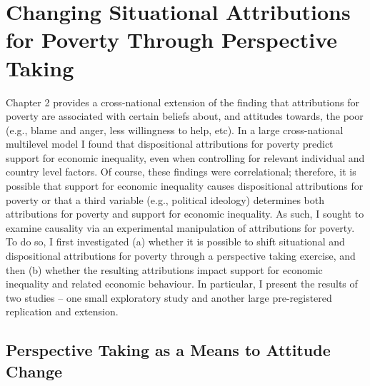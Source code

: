 \documentclass{sfuthesis}
\begin{document}
\chapter{Changing Situational Attributions for Poverty Through Perspective Taking}

Chapter 2 provides a cross-national extension of the finding that attributions for poverty are associated with certain beliefs about, and attitudes towards, the poor (e.g., blame and anger, less willingness to help, etc). In a large cross-national multilevel model I found that dispositional attributions for poverty predict support for economic inequality, even when controlling for relevant individual and country level factors. Of course, these findings were correlational; therefore, it is possible that support for economic inequality causes dispositional attributions for poverty or that a third variable (e.g., political ideology) determines both attributions for poverty and support for economic inequality. As such, I sought to examine causality via an experimental manipulation of attributions for poverty. To do so, I first investigated (a) whether it is possible to shift situational and dispositional attributions for poverty through a perspective taking exercise, and then (b) whether the resulting attributions impact support for economic inequality and related economic behaviour. In particular, I present the results of two studies – one small exploratory study and another large pre-registered replication and extension.

\section{Perspective Taking as a Means to Attitude Change}
\end{document}
